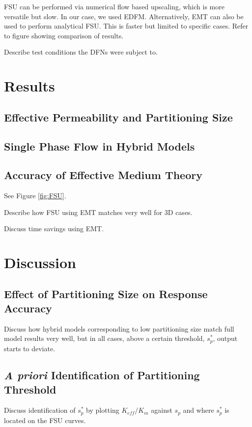 \documentclass[a4paper]{article}
\begin{document}
FSU can be performed via numerical flow based upscaling, which is more versatile but slow. In our case, we used EDFM. Alternatively, EMT can also be used to perform analytical FSU. This is faster but limited to specific cases. Refer to figure showing comparison of results.

Describe test conditions the DFNs were subject to.

\section{Results}
\subsection{Effective Permeability and Partitioning Size}


\subsection{Single Phase Flow in Hybrid Models}



\subsection{Accuracy of Effective Medium Theory}
See Figure \ref{fig:FSU}.

Describe how FSU using EMT matches very well for 3D cases.

Discuss time savings using EMT.

\section{Discussion}
\subsection{Effect of Partitioning Size on Response Accuracy}
Discuss how hybrid models corresponding to low partitioning size match full model results very well, but in all cases, above a certain threshold, $s_p^*$, output starts to deviate.

\subsection{\textit{A priori} Identification of Partitioning Threshold}
Discuss identification of $s_p^*$ by plotting $K_{eff}/K_m$ against $s_p$ and where $s_p^*$ is located on the FSU curves.
\end{document}
